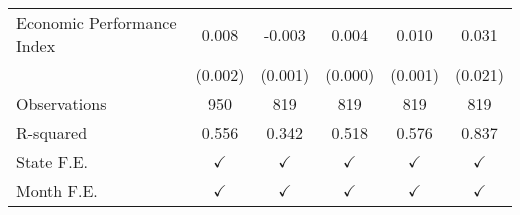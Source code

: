 \begin{tabular}{lccccc}
\addlinespace
Economic Performance Index&       0.008\sym{***}&      -0.003\sym{**} &       0.004\sym{***}&       0.010\sym{***}&       0.031         \\
                    &     (0.002)         &     (0.001)         &     (0.000)         &     (0.001)         &     (0.021)         \\
\arrayrulecolor{black!10}\midrule
Observations        &         950         &         819         &         819         &         819         &         819         \\
R-squared           &       0.556         &       0.342         &       0.518         &       0.576         &       0.837         \\
State F.E.          &$\checkmark$         &$\checkmark$         &$\checkmark$         &$\checkmark$         &$\checkmark$         \\
Month F.E.          &$\checkmark$         &$\checkmark$         &$\checkmark$         &$\checkmark$         &$\checkmark$         \\



\end{tabular}
